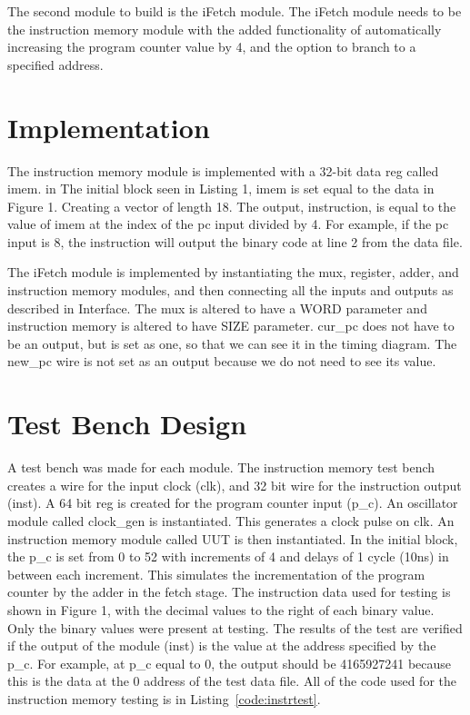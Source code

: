 \documentclass{article}
\newcommand{\Verilog}[3]{
  \lstset{language=Verilog}
  \lstset{backgroundcolor=\color{listinggray},rulecolor=\color{blue}}
  \lstset{linewidth=\textwidth}
  \lstset{commentstyle=\textit, stringstyle=\upshape,showspaces=false}
  \lstset{frame=tb}
  
}
\begin{document}
The second module to build is the iFetch module. The iFetch module needs to be the instruction memory module with the added functionality of automatically increasing the program counter value by 4, and the option to branch to a specified address. 


\section{Implementation}
The instruction memory module is implemented with a 32-bit data reg called imem. in The initial block seen in Listing 1, imem is set equal to the data in Figure 1. Creating a vector of length 18. The output, instruction, is equal to the value of imem at the index of the pc input divided by 4.  For example, if the pc input is 8, the instruction will output the binary code at line 2 from the data file.

\Verilog{Verilog code for implementing the instruction memory module.}{code:adder}{../code/1_fetch/instr_mem.v}

The iFetch module is implemented by instantiating the mux, register, adder, and instruction memory modules, and then connecting all the inputs and outputs as described in Interface. The mux is altered to have a WORD parameter and instruction memory is altered to have SIZE parameter.  cur\_pc does not have to be an output, but is set as one, so that we can see it in the timing diagram. The new\_pc wire is not set as an output because we do not need to see its value. 

\Verilog{Verilog code for implementing the iFetch module.}{code:mux}{../code/1_fetch/iFetch.v}

\section{Test Bench Design}
A test bench was made for each module. The instruction memory test bench creates a wire for the input clock (clk), and 32 bit wire for the instruction output (inst). A 64 bit reg is created for the program counter input (p\_c). An oscillator module called clock\_gen is instantiated. This generates a clock pulse on clk. An instruction memory module called UUT is then instantiated. In the initial block, the p\_c is set from 0 to 52 with increments of 4 and delays of 1 cycle (10ns) in between each increment. This simulates the incrementation of the program counter by the adder in the fetch stage. The instruction data used for testing is shown in Figure 1, with the decimal values to the right of each binary value. Only the binary values were present at testing. The results of the test are verified if the output of the module (inst) is the value at the address specified by the p\_c. For example, at p\_c equal to 0, the output should be 4165927241 because this is the data at the 0 address of the test data file. All of the code used for the instruction memory testing is in Listing~\ref{code:instrtest}.
\end{document}
